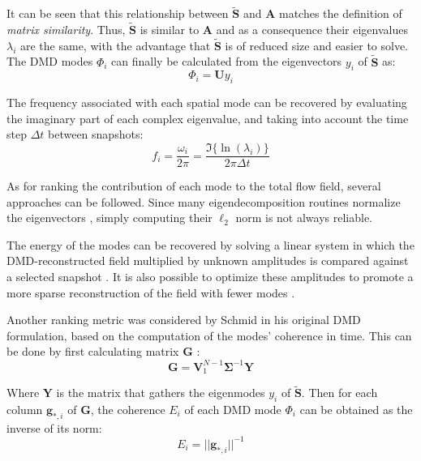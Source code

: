 It can be seen that this relationship between $\widetilde{\mathbf{S}}$ and $\mathbf A$ matches the definition of \emph{matrix similarity}. Thus, $\widetilde{\mathbf{S}}$ is similar to $\mathbf A$ and as a consequence their eigenvalues $\lambda_i$ are the same, with the advantage that $\widetilde{\mathbf{S}}$ is of reduced size and easier to solve. The DMD modes $\Phi_i$ can finally be calculated from the eigenvectors $y_i$ of $\widetilde{\mathbf{S}}$ as:
\begin{equation}
	\Phi_i = \mathbf U y_i
\end{equation}

The frequency associated with each spatial mode can be recovered by evaluating the imaginary part of each complex eigenvalue, and taking into account the time step $\Delta t$ between snapshots:
\begin{equation}
	f_i = \frac{\omega_i}{2\pi} = \frac{\Im\{\ln(\lambda_i)\}}{2\pi\Delta t}
\end{equation}

As for ranking the contribution of each mode to the total flow field, several approaches can be followed. Since many eigendecomposition routines normalize the eigenvectors \cite{futrzynski2015dymode}, simply computing their $\ell_2$ norm is not always reliable. 

The energy of the modes can be recovered by solving a linear system in which the DMD-reconstructed field multiplied by unknown amplitudes is compared against a selected snapshot \cite{futrzynski2015dymode}. It is also possible to optimize these amplitudes to promote a more sparse reconstruction of the field with fewer modes \cite{jovanovic2014sparsity}. 

Another ranking metric was considered by Schmid \cite{schmid2010dynamic} in his original DMD formulation, based on the computation of the modes' coherence in time. This can be done by first calculating matrix $\mathbf G$ \cite{delorne2014dynamic}:
\begin{equation}
	\mathbf G=\mathbf V_1^{N-1}\bm\Sigma^{-1} \mathbf Y
\end{equation}

Where $\mathbf Y$ is the matrix that gathers the eigenmodes $y_i$ of $\widetilde{\mathbf{S}}$. Then for each column $\mathbf g_{*,i}$ of $\mathbf G$, the coherence $E_i$ of each DMD mode $\Phi_i$ can be obtained as the inverse of its norm:
\begin{equation}
	E_i = ||\mathbf g_{*,i}||^{-1}
\end{equation}

